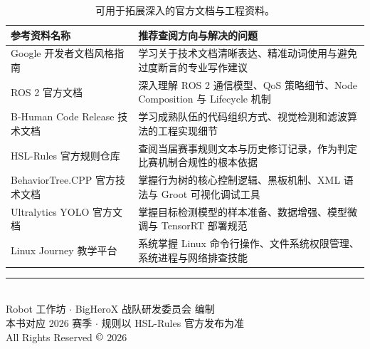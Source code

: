 \begin{table}[H]
\centering
\small
\begin{tabularx}{\textwidth}{p{3.6cm} X}
\toprule
\textbf{参考资料名称} & \textbf{推荐查阅方向与解决的问题} \\
\midrule
Google 开发者文档风格指南 & 学习关于技术文档清晰表达、精准动词使用与避免过度断言的专业写作建议 \\
\addlinespace
ROS 2 官方文档 & 深入理解 ROS 2 通信模型、QoS 策略细节、Node Composition 与 Lifecycle 机制 \\
\addlinespace
B-Human Code Release 技术文档 & 学习成熟队伍的代码组织方式、视觉检测和滤波算法的工程实现细节 \\
\addlinespace
HSL-Rules 官方规则仓库 & 查阅当届赛事规则文本与历史修订记录，作为判定比赛机制合规性的根本依据 \\
\addlinespace
BehaviorTree.CPP 官方技术文档 & 掌握行为树的核心控制逻辑、黑板机制、XML 语法与 Groot 可视化调试工具 \\
\addlinespace
Ultralytics YOLO 官方文档 & 掌握目标检测模型的样本准备、数据增强、模型微调与 TensorRT 部署规范 \\
\addlinespace
Linux Journey 教学平台 & 系统掌握 Linux 命令行操作、文件系统权限管理、系统进程与网络排查技能 \\
\bottomrule
\end{tabularx}
\caption{可用于拓展深入的官方文档与工程资料。}
\end{table}

\vspace{0.6cm}
\begin{center}
\rule{0.6\textwidth}{0.5pt}\\[0.3cm]
{\small \textsf{Robot 工作坊 \(\cdot\) BigHeroX 战队研发委员会 编制}}\\[0.1cm]
{\footnotesize \textsf{本书对应 2026 赛季 \(\cdot\) 规则以 HSL-Rules 官方发布为准}}\\[0.1cm]
{\footnotesize \textsf{All Rights Reserved \(\copyright\) 2026}}
\end{center}

\newpage